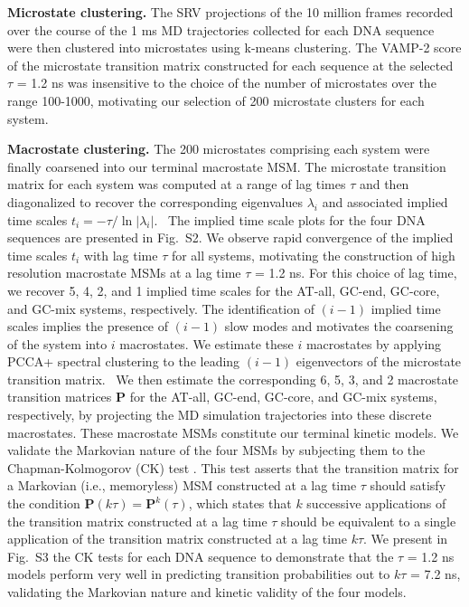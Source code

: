 \documentclass[journal=jpcbfk,manuscript=article]{achemso}
\newcommand*{\blauw}[1]{{#1}}
\begin{document}
\textbf{Microstate clustering.} The SRV projections of the 10 million frames recorded over the course of the 1 ms MD trajectories collected for each DNA sequence were then clustered into microstates using k-means clustering. The VAMP-2 score of the microstate transition matrix constructed for each sequence at the selected $\tau$ = 1.2 ns was insensitive to the choice of the number of microstates over the range 100-1000, motivating our selection of 200 microstate clusters for each system.

\textbf{Macrostate clustering.} The 200 microstates comprising each system were finally coarsened into our terminal macrostate MSM. The microstate transition matrix for each system was computed at a range of lag times $\tau$ and then diagonalized to recover the corresponding eigenvalues $\lambda_i$ and associated implied time scales $t_i = -\tau / \ln \left| \lambda_i \right|$.~\citep{Wehmeyer2019IntroductionSoftware} The implied time scale plots for the four DNA sequences are presented in \blauw{Fig.~S2}. We observe rapid convergence of the implied time scales $t_i$ with lag time $\tau$ for all systems, motivating the construction of high resolution macrostate MSMs at a lag time $\tau$ = 1.2 ns. For this choice of lag time, we recover 5, 4, 2, and 1 implied time scales for the AT-all, GC-end, GC-core, and GC-mix systems, respectively. The identification of $(i-1)$ implied time scales implies the presence of $(i-1)$ slow modes and motivates the coarsening of the system into $i$ macrostates. We estimate these $i$ macrostates by applying PCCA+ spectral clustering to the leading $(i-1)$ eigenvectors of the microstate transition matrix.~\citep{Roblitz2013FuzzyClassification, Weber2018ImplicationsSimulation, Kube2007AConformations} We then estimate the corresponding 6, 5, 3, and 2 macrostate transition matrices $\mathbf{P}$ for the AT-all, GC-end, GC-core, and GC-mix systems, respectively, by projecting the MD simulation trajectories into these discrete macrostates. These macrostate MSMs constitute our terminal kinetic models. We validate the Markovian nature of the four MSMs by subjecting them to the Chapman-Kolmogorov (CK) test \citep{Noe2009ConstructingSimulations,Prinz2011OptimalDynamics, Wehmeyer2019IntroductionSoftware}. This test asserts that the transition matrix for a Markovian (i.e., memoryless) MSM constructed at a lag time $\tau$ should satisfy the condition $\mathbf{P}(k \tau) = \mathbf{P}^k(\tau)$, which states that $k$ successive applications of the transition matrix constructed at a lag time $\tau$ should be equivalent to a single application of the transition matrix constructed at a lag time $k \tau$. We present in \blauw{Fig.~S3} the CK tests for each DNA sequence to demonstrate that the $\tau$ = 1.2 ns models perform very well in predicting transition probabilities out to $k \tau$ = 7.2 ns, validating the Markovian nature and kinetic validity of the four models.
\end{document}
